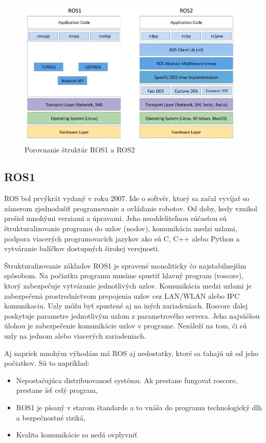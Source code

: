 \begin{figure}[!htbp]
	\centering
	\includegraphics[width=15cm]{img/strukturaRos1Ros2.png}
	\caption{Porovnanie štruktúr ROS1 a ROS2 \cite{comparison}}
	\label{o_struktury}
\end{figure}

\pagebreak

\subsection{ROS1}

\noindent ROS bol prvýkrát vydaný v roku 2007. Ide o softvér, ktorý sa začal vyvíjať so zámerom zjednodušiť programovanie a ovládanie robotov. Od doby,
kedy vznikol prešiel mnohými verziami a úpravami. Jeho neoddeliteľnou súčasťou sú štrukturalizovanie programu do uzlov (nodov), komunikácia medzi uzlami,
podpora viacerých programovacích jazykov ako sú C, C++ alebo Python a vytváranie balíčkov dostupných širokej verejnosti.

Štrukturalizovanie základov ROS1 je spravené monoliticky čo najstabilnejším spôsobom. Na počiatku programu musíme spustiť hlavný program (roscore),
ktorý zabezpečuje vytváranie jednotlivých uzlov. Komunikácia medzi uzlami je zabezpečená prostredníctvom prepojenia uzlov cez LAN/WLAN alebo IPC komunikaciu.
Uzly môžu byť spustené aj na iných zariadeniach. Roscore ďalej poskytuje parametre jednotlivým uzlom z parametrového servera. Jeho najväčšou úlohou je zabezpečenie
komunikácie uzlov v programe. Nezáleží na tom, či sú uzly na jednom alebo viacerých zariadeniach.

\pagebreak

Aj napriek mnohým výhodám má ROS aj nedostatky, ktoré sa ťahajú už od jeho počiatkov. Sú to napríklad:
\begin{itemize}
	\item Nepostačujúca distribuovanosť systému. Ak prestane fungovať roscore, prestane ísť celý program,
	\item ROS1 je písaný v starom štandarde a to vnáša do programu technologický dlh a bezpečnostné riziká,
	\item Kvalita komunikácie sa nedá ovplyvniť
\end{itemize}

